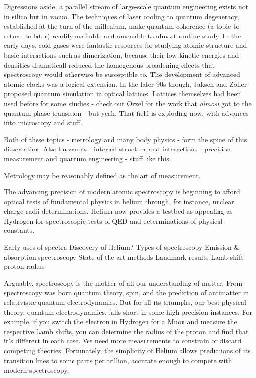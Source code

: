 Digressions aside, a parallel stream of large-scale quantum engineering
exists not in silico but in vacuo. The techniques of laser cooling to
quantum degeneracy, established at the turn of the millenium, make
quantum coherence (a topic to return to later) readily available and
amenable to almost routine study. In the early days, cold gases were
fantastic resources for studying atomic structure and basic interactions
such as dimerization, because their low kinetic energies and densities
dramaticall reduced the homogenous broadening effects that spectroscopy
would otherwise be susceptible to. The development of advanced atomic
clocks was a logical extension. In the later 90s though, Jaksch and
Zoller proposed quantum simulation in optical lattices. Lattices
themselves had been used before for some studies - check out Orzel for
the work that \emph{almost} got to the quantum phase transition - but
yeah. That field is exploding now, with advances into microscopy and
stuff.

Both of these topics - metrology and many body physics - form the spine
of this dissertation. Also known as - internal structure and
interactions - precision measurement and quantum engineering - stuff
like this.



Metrology may be reasonably defined as the art of measurement.

The advancing precision of modern atomic spectroscopy is beginning to afford optical tests of fundamental physics in helium through, for instance, nuclear charge radii determinations. Helium now provides a testbed as appealing as Hydrogen for spectroscopic tests of QED and determinations of physical constants. 

Early uses of spectra Discovery of Helium? Types of spectroscopy
Emission \& absorption spectroscopy State of the art methods Landmark
results Lamb shift proton radius

Arguably, spectroscopy is the mother of all our understanding of matter. From spectroscopy was born quantum theory, spin, and the prediction of antimatter in relativistic quantum electrodynamics. But for all its triumphs, our best physical theory, quantum electrodynamics, falls short in some high-precision instances. For example, if you switch the electron in Hydrogen for a Muon and measure the respective Lamb shifts, you can determine the radius of the proton and find that it's different in each case. We need more measurements to constrain or discard competing theories. Fortunately, the simplicity of Helium allows predictions of its transition lines to some parts per trillion, accurate enough to compete with modern spectroscopy.

